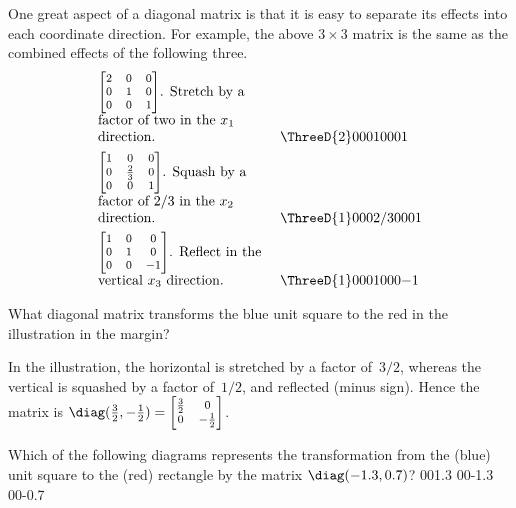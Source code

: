 One great aspect of a diagonal matrix is that it is easy to separate its effects into each coordinate direction.  
For example, the above \(3\times3\) matrix is the same as the combined effects of the following three.
\begin{align*}
&\parbox[b]{0.35\linewidth}{\raggedright
\(\footnotesize\begin{bmatrix} 2&0&0\\0&1&0\\0&0&1 \end{bmatrix}\).  Stretch by a factor of two in the \(x_1\) direction.} &&
\ThreeD{2}000{1}000{1} 
\\&
\parbox[b]{0.35\linewidth}{\raggedright
\(\footnotesize\begin{bmatrix} 1&0&0\\0&\frac23&0\\0&0&1 \end{bmatrix}\).  Squash by a factor of \(2/3\) in the \(x_2\) direction.} &&
\ThreeD{1}000{2/3}000{1} 
\\&
\parbox[b]{0.35\linewidth}{\raggedright
\(\footnotesize\begin{bmatrix} 1&0&0\\0&1&0\\0&0&-1 \end{bmatrix}\).  Reflect in the  vertical \(x_3\) direction.} &&
\ThreeD{1}000{1}000{-1} 
\end{align*}





\begin{example} \label{eg:}
What diagonal matrix transforms the blue unit square to the red in the illustration in the margin? 
\begin{solution} 
In the illustration, the horizontal is stretched by a factor of~\(3/2\), whereas the vertical is squashed by a factor of~\(1/2\), and reflected (minus sign). 
Hence the matrix is
\(\diag(\frac32,-\frac12)=\footnotesize\begin{bmatrix} \frac32&0\\0&-\frac12 \end{bmatrix}\).
\end{solution}
\end{example}




\begin{activity}
Which of the following diagrams represents the transformation from the (blue) unit square to the (red) rectangle by the matrix \(\diag(-1.3,0.7)\)?
{00{1.3}}
{00{-1.3}}
{00{-0.7}}
\end{activity}




